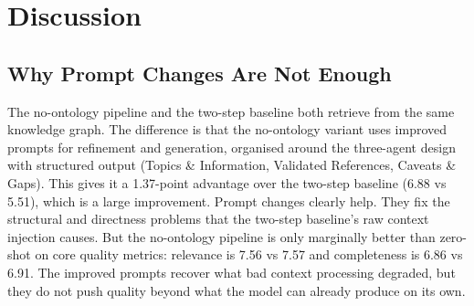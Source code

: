 \chapter{Discussion}
\label{chap:discussion}

\section{Why Prompt Changes Are Not Enough}
\label{sec:discuss-prompts}

The no-ontology pipeline and the two-step baseline both retrieve from the same knowledge graph. The difference is that the no-ontology variant uses improved prompts for refinement and generation, organised around the three-agent design with structured output (Topics \& Information, Validated References, Caveats \& Gaps). This gives it a 1.37-point advantage over the two-step baseline (6.88 vs 5.51), which is a large improvement. Prompt changes clearly help. They fix the structural and directness problems that the two-step baseline's raw context injection causes. But the no-ontology pipeline is only marginally better than zero-shot on core quality metrics: relevance is 7.56 vs 7.57 and completeness is 6.86 vs 6.91. The improved prompts recover what bad context processing degraded, but they do not push quality beyond what the model can already produce on its own.

